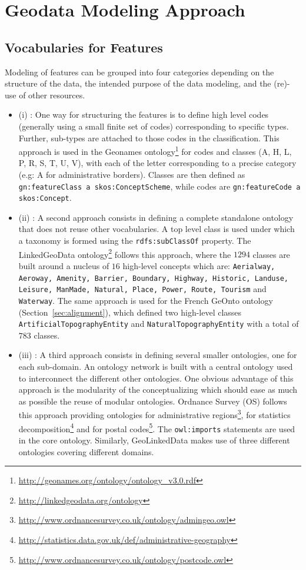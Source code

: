 \documentclass[a4paper,11pt]{report}
\begin{document}
\section{Geodata Modeling Approach}                                         \label{sec:modeling-approach}

\subsection{Vocabularies for Features}
Modeling of features can be grouped into four categories depending on the structure of the data, the intended purpose of the data modeling, and the (re)-use of other resources.
\begin{itemize}
  \item (i) : One way for structuring the features is to define high level codes (generally using a small finite set of codes) corresponding to specific
      types. Further, sub-types are attached to those codes in the classification. This approach is used in the Geonames ontology\footnote{\url{http://geonames.org/ontology/ontology_v3.0.rdf}} for codes and classes (A, H, L, P, R, S, T, U, V), with each of the letter corresponding to a precise category (e.g: A for administrative borders). Classes are then defined as \texttt{gn:featureClass a skos:ConceptScheme}, while codes are \texttt{gn:featureCode a skos:Concept}.
  \item (ii) : A second approach consists in defining a complete standalone ontology that does not reuse other vocabularies. A top level class is used under which a taxonomy is formed using the \texttt{rdfs:subClassOf} property. The LinkedGeoData ontology\footnote{\url{http://linkedgeodata.org/ontology}} follows this approach, where the $1294$ classes are built around a nucleus of $16$ high-level concepts which are: \texttt{Aerialway, Aeroway, Amenity, Barrier, Boundary, Highway, Historic, Landuse, Leisure, ManMade, Natural, Place, Power, Route, Tourism} and \texttt{Waterway}. The same approach is used for the French GeOnto ontology (Section~\ref{sec:alignment}), which defined two high-level classes \texttt{ArtificialTopographyEntity} and \texttt{Natural\-TopographyEntity} with a total of $783$ classes.
  \item (iii) : A third approach consists in defining several smaller ontologies, one for each sub-domain. An ontology network is built with a central ontology used to interconnect the different other ontologies. One obvious advantage of this approach is the modularity of the conceptualizing which should ease as much as possible the reuse of modular ontologies. Ordnance Survey (OS) follows this approach providing ontologies for administrative regions\footnote{\url{http://www.ordnancesurvey.co.uk/ontology/admingeo.owl}}, for statistics decomposition\footnote{\url{http://statistics.data.gov.uk/def/administrative-geography}} and for postal codes\footnote{\url{http://www.ordnancesurvey.co.uk/ontology/postcode.owl}}. The \texttt{owl:imports} statements are used in the core ontology. Similarly, GeoLinkedData makes use of three different ontologies covering different domains.

\end{itemize}
\end{document}
